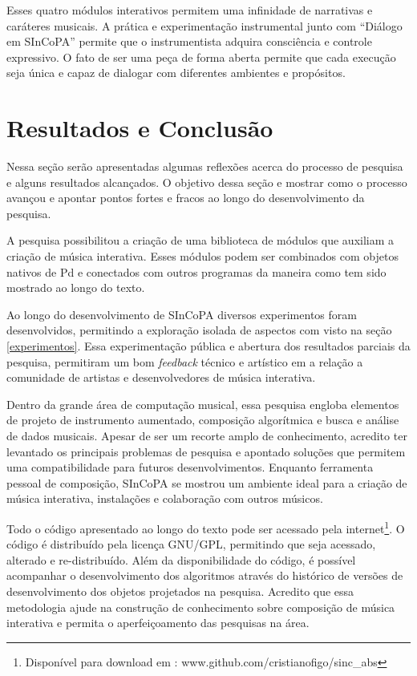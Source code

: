 \documentclass{ppgmus}
\begin{document}
Esses quatro módulos interativos permitem uma infinidade de narrativas e caráteres musicais.
A prática e experimentação instrumental junto com ``Diálogo em SInCoPA'' permite que o instrumentista 
adquira consciência e controle expressivo. O fato de ser uma peça de forma aberta permite que
cada execução seja única e capaz de dialogar com diferentes ambientes e propósitos.




\chapter{Resultados e Conclusão}
\label{sec:conclusao}

Nessa seção serão apresentadas algumas reflexões acerca
do processo de pesquisa e alguns resultados alcançados.
O objetivo dessa seção e mostrar como o processo avançou
e apontar pontos fortes e fracos ao longo do desenvolvimento da pesquisa.

A pesquisa possibilitou a criação de uma biblioteca de módulos que auxiliam
a criação de música interativa.	Esses módulos podem ser combinados com objetos
nativos de Pd e conectados com outros programas da maneira como tem sido
mostrado ao longo do texto.

Ao longo do desenvolvimento de SInCoPA diversos experimentos foram desenvolvidos,
permitindo a exploração isolada de aspectos com visto na seção \ref{experimentos}.
Essa experimentação pública e abertura dos resultados parciais da pesquisa, permitiram
um bom \textit{feedback} técnico e artístico em a relação a comunidade de 
artistas e desenvolvedores de música interativa.


Dentro da grande área de computação musical, essa pesquisa engloba elementos de projeto
de instrumento aumentado, composição algorítmica e busca e análise de dados musicais.
Apesar de ser um recorte amplo de conhecimento, acredito ter levantado os principais
problemas de pesquisa e apontado soluções que permitem uma compatibilidade para futuros desenvolvimentos.
Enquanto ferramenta pessoal de composição, SInCoPA se mostrou um ambiente ideal
para a criação de música interativa, instalações e colaboração com outros
músicos.

Todo o código apresentado ao longo do texto pode ser acessado pela internet\footnote{Disponível
para download em : www.github.com/cristianofigo/sinc\_abs}. O código é distribuído
pela licença GNU/GPL, permitindo que seja acessado, alterado e re-distribuído.
Além da disponibilidade do código, é possível acompanhar o desenvolvimento dos
algoritmos através do histórico de versões de desenvolvimento dos objetos projetados
na pesquisa. Acredito que essa metodologia ajude na construção de conhecimento sobre
composição de música interativa e permita o aperfeiçoamento das pesquisas na área.
\end{document}
